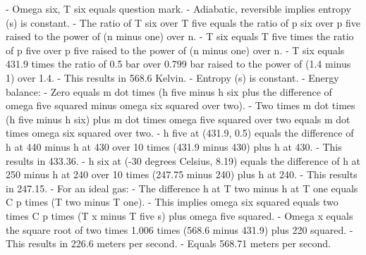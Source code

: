- Omega six, T six equals question mark.
- Adiabatic, reversible implies entropy (s) is constant.
- The ratio of T six over T five equals the ratio of p six over p five raised to the power of (n minus one) over n.
- T six equals T five times the ratio of p five over p five raised to the power of (n minus one) over n.
- T six equals 431.9 times the ratio of 0.5 bar over 0.799 bar raised to the power of (1.4 minus 1) over 1.4.
- This results in 568.6 Kelvin.
- Entropy (s) is constant.
- Energy balance:
- Zero equals m dot times (h five minus h six plus the difference of omega five squared minus omega six squared over two).
- Two times m dot times (h five minus h six) plus m dot times omega five squared over two equals m dot times omega six squared over two.
- h five at (431.9, 0.5) equals the difference of h at 440 minus h at 430 over 10 times (431.9 minus 430) plus h at 430.
- This results in 433.36.
- h six at (-30 degrees Celsius, 8.19) equals the difference of h at 250 minus h at 240 over 10 times (247.75 minus 240) plus h at 240.
- This results in 247.15.
- For an ideal gas:
- The difference h at T two minus h at T one equals C p times (T two minus T one).
- This implies omega six squared equals two times C p times (T x minus T five s) plus omega five squared.
- Omega x equals the square root of two times 1.006 times (568.6 minus 431.9) plus 220 squared.
- This results in 226.6 meters per second.
- Equals 568.71 meters per second.